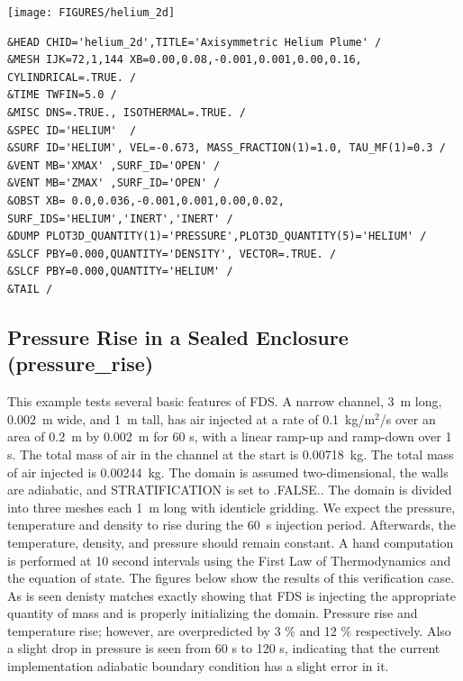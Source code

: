 \documentclass[11pt]{book}
\begin{document}
\vspace{0.2in}
\scriptsize
\noindent
\begin{minipage}{1.1in}
\texttt{[image: FIGURES/helium\_2d]}
\end{minipage}
\hfill
\begin{minipage}{5.5in}
\begin{verbatim}
&HEAD CHID='helium_2d',TITLE='Axisymmetric Helium Plume' /
&MESH IJK=72,1,144 XB=0.00,0.08,-0.001,0.001,0.00,0.16, CYLINDRICAL=.TRUE. /
&TIME TWFIN=5.0 /
&MISC DNS=.TRUE., ISOTHERMAL=.TRUE. /
&SPEC ID='HELIUM'  /
&SURF ID='HELIUM', VEL=-0.673, MASS_FRACTION(1)=1.0, TAU_MF(1)=0.3 /
&VENT MB='XMAX' ,SURF_ID='OPEN' /
&VENT MB='ZMAX' ,SURF_ID='OPEN' /
&OBST XB= 0.0,0.036,-0.001,0.001,0.00,0.02, SURF_IDS='HELIUM','INERT','INERT' /
&DUMP PLOT3D_QUANTITY(1)='PRESSURE',PLOT3D_QUANTITY(5)='HELIUM' /
&SLCF PBY=0.000,QUANTITY='DENSITY', VECTOR=.TRUE. /
&SLCF PBY=0.000,QUANTITY='HELIUM' /
&TAIL /
\end{verbatim}
\end{minipage}
\normalsize


\clearpage

\subsection{Pressure Rise in a Sealed Enclosure ({\bf pressure\_rise})  }

This example tests several basic features of FDS. A narrow channel, 3~m long, 0.002~m wide, and 1~m tall, has air injected at a rate of
0.1~kg/m$^2$/s over an area of 0.2~m by 0.002~m for 60 s, with a linear ramp-up and ramp-down over 1 s. The total mass of air in the channel at the start
is 0.00718~kg. The total mass of air injected is 0.00244~kg.
The domain is assumed two-dimensional, the walls are adiabatic, and {\ct STRATIFICATION} is set to {\ct .FALSE.}. The domain is divided into three
meshes each 1~m long with identicle gridding.  We expect the pressure,
 temperature and density to rise during the 60~s injection period. Afterwards, the
temperature, density, and pressure should remain constant. A hand computation is performed at 10 second intervals using the First Law of
Thermodynamics and the equation of state.  The figures below show the results of this verification case.  As is seen denisty
matches exactly showing that FDS is injecting the appropriate quantity of mass and is properly initializing the domain.
Pressure rise and temperature rise; however, are overpredicted by 3 \% and 12 \% respectively.  Also a slight drop in pressure
is seen from 60 s to 120 s, indicating that the current implementation adiabatic boundary condition has a slight error in it.
\end{document}
